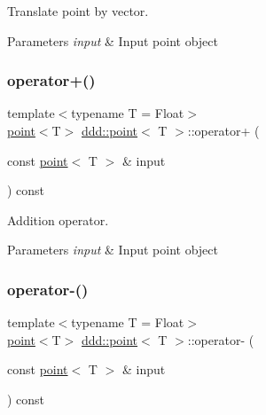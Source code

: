 Translate point by vector. 


\begin{DoxyParams}{Parameters}
{\em input} & Input point object \\
\hline
\end{DoxyParams}
\mbox{\label{classddd_1_1point_ab0b0c990b117bb889d34d44509b645be}} 
\subsubsection{\texorpdfstring{operator+()}{operator+()}}
{\footnotesize\ttfamily template$<$typename T = Float$>$ \\
\hyperlink{classddd_1_1point}{point}$<$T$>$ \hyperlink{classddd_1_1point}{ddd\+::point}$<$ T $>$\+::operator+ (\begin{DoxyParamCaption}\item[{const \hyperlink{classddd_1_1point}{point}$<$ T $>$ \&}]{input }\end{DoxyParamCaption}) const\hspace{0.3cm}{\ttfamily [inline]}}



Addition operator. 


\begin{DoxyParams}{Parameters}
{\em input} & Input point object \\
\hline
\end{DoxyParams}
\mbox{\label{classddd_1_1point_a5621f5a883c88d5588e09f9ff0de6575}} 
\subsubsection{\texorpdfstring{operator-\/()}{operator-()}}
{\footnotesize\ttfamily template$<$typename T = Float$>$ \\
\hyperlink{classddd_1_1point}{point}$<$T$>$ \hyperlink{classddd_1_1point}{ddd\+::point}$<$ T $>$\+::operator-\/ (\begin{DoxyParamCaption}\item[{const \hyperlink{classddd_1_1point}{point}$<$ T $>$ \&}]{input }\end{DoxyParamCaption}) const\hspace{0.3cm}{\ttfamily [inline]}}



